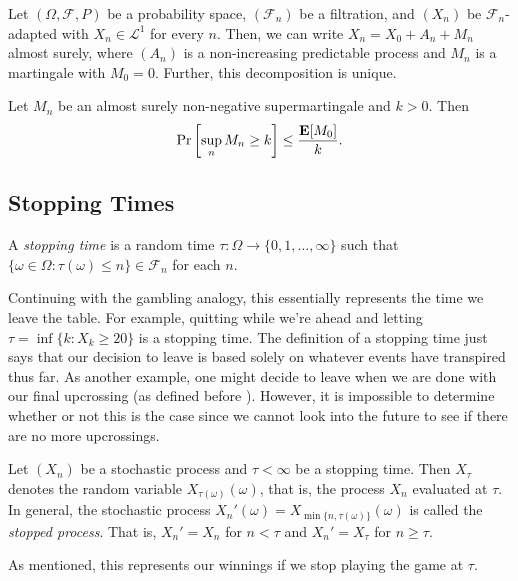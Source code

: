 \begin{lemma}
	Let $(\Omega,\mathcal{F},P)$ be a probability space, $(\mathcal{F}_n)$ be a filtration, and $(X_n)$ be $\mathcal{F}_n$-adapted with $X_n\in\mathcal{L}^1$ for every $n$. Then, we can write $X_n = X_0 + A_n + M_n$ almost surely, where $(A_n)$ is a non-increasing predictable process and $M_n$ is a martingale with $M_0=0$. Further, this decomposition is unique.
\end{lemma}

\begin{lemma}
	Let $M_n$ be an almost surely non-negative supermartingale and $k>0$. Then
	\[ \Pr\left[\sup_n M_n \geq k\right] \leq \frac{\textbf{E}[M_0]}{k}. \]
\end{lemma}

\subsection{Stopping Times}

\begin{definition}
	A \textit{stopping time} is a random time $\tau:\Omega\to\{0,1,\ldots,\infty\}$ such that $\{\omega\in\Omega : \tau(\omega)\leq n\}\in\mathcal{F}_n$ for each $n$.
\end{definition}

Continuing with the gambling analogy, this essentially represents the time we leave the table. For example, quitting while we're ahead and letting $\tau=\inf\{k : X_k \geq 20\}$ is a stopping time. The definition of a stopping time just says that our decision to leave is based solely on whatever events have transpired thus far. As another example, one might decide to leave when we are done with our final upcrossing (as defined before ). However, it is impossible to determine whether or not this is the case since we cannot look into the future to see if there are no more upcrossings.

\begin{definition}
	Let $(X_n)$ be a stochastic process and $\tau<\infty$ be a stopping time. Then $X_\tau$ denotes the random variable $X_{\tau(\omega)}(\omega)$, that is, the process $X_n$ evaluated at $\tau$. In general, the stochastic process $X_n'(\omega) = X_{\min\{n,\tau(\omega)\}}(\omega)$ is called the \textit{stopped process}. That is, $X_n'=X_n$ for $n<\tau$ and $X_n' = X_\tau$ for $n\geq\tau$.
\end{definition}

As mentioned, this represents our winnings if we stop playing the game at $\tau$.

